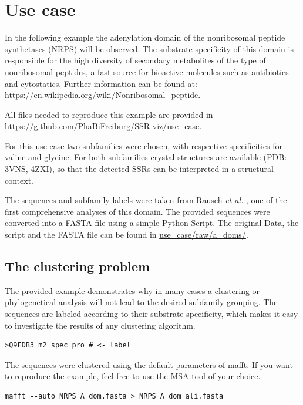 \documentclass[a4paper,10pt]{article}
\begin{document}
\section{Use case} \label{example}

In the following example the adenylation domain of the nonribosomal peptide synthetases (NRPS) will be observed.
The substrate specificity of this domain is responsible for the high diversity of secondary metabolites of the 
type of nonribosomal peptides, a fast source for bioactive molecules such as antibiotics and cytostatics.
Further information can be found at: \url{https://en.wikipedia.org/wiki/Nonribosomal_peptide}.

All files needed to reproduce this example are provided in  \url{https://github.com/PhaBiFreiburg/SSR-viz/use_case}.

For this use case two subfamilies were
chosen, with respective specificities for valine and glycine. 
For both
subfamilies crystal structures are available (PDB: 3VNS, 4ZXI), so that
the detected SSRs can be interpreted in a structural context.

The sequences and subfamily labels were taken from Rausch \textit{et al.} \cite{rausch_specificity_2005}, one of the first comprehensive analyses of this domain.
The provided sequences were converted into a FASTA file using a simple Python Script. The original Data, the script and the FASTA
file can be found in \url{use_case/raw/a_doms/}.

\subsection{The clustering problem}

The provided example demonstrates why in many cases a clustering or phylogenetical analysis will not lead to
the desired subfamily grouping. The sequences are labeled according to their substrate specificity, which makes it 
easy to investigate the results of any clustering algorithm.

\begin{verbatim}
>Q9FDB3_m2_spec_pro # <- label
\end{verbatim}

The sequences were clustered using the default parameters of mafft.
If you want to reproduce the example, feel free to use the MSA tool of your choice.

\begin{verbatim}
mafft --auto NRPS_A_dom.fasta > NRPS_A_dom_ali.fasta
\end{verbatim}
\end{document}
